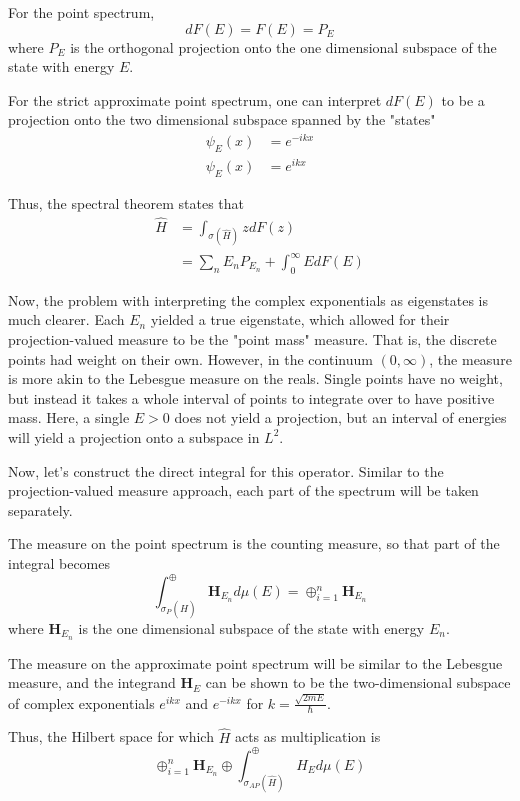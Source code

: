 For the point spectrum, 
\[
    dF(E) = F(E) = P_E
\]
where $P_E$ is the orthogonal
projection onto the one dimensional subspace of the state with energy $E$.

For the strict approximate point spectrum, one can interpret $dF(E)$ to be a
projection onto the two dimensional subspace spanned by the "states"
\[
    \begin{aligned}
        \psi_{E}(x) &= e^{-ikx} \\
        \psi_{E}(x) &= e^{ikx}
    \end{aligned}
\]

Thus, the spectral theorem states that
\[
    \begin{aligned}
        \hat{H} &= \int_{\sigma(\hat{H})}zdF(z)\\
                &= \sum_{n} E_n P_{E_n} + \int_0^{\infty}EdF(E)
    \end{aligned}
\]

Now, the problem with interpreting the complex exponentials as eigenstates is
much clearer. Each $E_n$ yielded a true eigenstate, which allowed for their
projection-valued measure to be the "point mass" measure. That is, the discrete
points had weight on their own. However, in the continuum $(0,\infty)$, the
measure is more akin to the Lebesgue measure on the reals. Single points have no
weight, but instead it takes a whole interval of points to integrate over to
have positive mass. Here, a single $E>0$ does not yield a projection, but an
interval of energies will yield a projection onto a subspace in $L^2$.

Now, let's construct the direct integral for this operator. Similar to the
projection-valued measure approach, each part of the spectrum will be taken
separately.

The measure on the point spectrum is the counting measure, so that part of
the integral becomes
\[
    \int_{\sigma_P(\hat{H})}^{\oplus}\textbf{H}_{E_n}d\mu(E) =
    \oplus_{i=1}^{n} \textbf{H}_{E_n}
\]
where $\textbf{H}_{E_n}$ is the one dimensional subspace of the state with
energy $E_n$.

The measure on the approximate point spectrum will be similar to the Lebesgue
measure, and the integrand $\textbf{H}_E$ can be shown to be the two-dimensional
subspace of complex exponentials $e^{ikx}$ and $e^{-ikx}$ for
$k=\frac{\sqrt{2mE}}{\hbar}$.

Thus, the Hilbert space for which $\hat{H}$ acts as multiplication is
\[
    \oplus_{i=1}^n \textbf{H}_{E_n} \oplus
    \int_{\sigma_{AP}(\hat{H})}^{\oplus} H_Ed\mu(E)
\]

